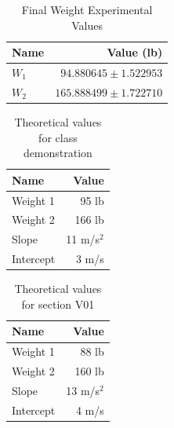\begin{table}[ht]
    \centering
    \begin{tabular}{|l|r|}
        \hline
        \textbf{Name} & \textbf{Value (lb)} \\
        \hline
        $W_{1}$ & $94.880645 \pm 1.522953$ \\
        $W_{2}$ & $165.888499 \pm 1.722710$ \\
        \hline
    \end{tabular}
    \caption{Final Weight Experimental Values}
    \label{table:00.final}
\end{table}
\newpage
\begin{table}[ht]
    \centering
    \begin{tabular}{|l|r|}
        \hline
        \textbf{Name} & \textbf{Value} \\
        \hline
        Weight 1 & 95 lb \\
        Weight 2 & 166 lb \\
        \hline
        Slope & 11 m/s$^{2}$ \\
        Intercept & 3 m/s \\
        \hline
    \end{tabular}
    \caption{Theoretical values for class demonstration}
    \label{table:00.theoretical.demo}
\end{table}
\begin{table}[ht]
    \centering
    \begin{tabular}{|l|r|}
        \hline
        \textbf{Name} & \textbf{Value} \\
        \hline
        Weight 1 & 88 lb \\
        Weight 2 & 160 lb \\
        \hline
        Slope & 13 m/s$^{2}$ \\
        Intercept & 4 m/s \\
        \hline
    \end{tabular}
    \caption{Theoretical values for section V01}
    \label{table:00.theoretical.v01}
\end{table}
